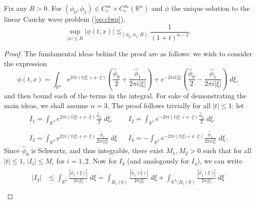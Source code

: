 \documentclass{article}
\begin{document}
\begin{prop}
	Fix any $R > 0$. For $(\phi_{0}, \phi_{1}) \in C_{c}^{\infty} \times C_{c}^{\infty}(\mathbb{R}^{n})$ and $\phi$ the unique solution to the linear Cauchy wave problem (\ref{eq:clwp}), 
	\begin{equation}
		\sup_{|x| \leq R}|\phi(t, x)|\lesssim_{(\phi_{0}, \phi_{1}, R)} \frac{1}{(1 + t)^{n - 1}}. 
		\label{eq:decay_clwp_1}
	\end{equation}
\end{prop}

\begin{proof}
	The fundamental ideas behind the proof are as follows: we wish to consider the expression 
	\begin{equation*}
		\phi(t, x) = \int_{\mathbb{R}^{n}}e^{2\pi i (t|\xi| + x \cdot \xi)}\left(\frac{\hat{\phi}_{0}}{2} + \frac{\hat{\phi}_{1}}{2\pi i |\xi|}\right) + e^{-2\pi i t|\xi|}\left(\frac{\hat{\phi}_{0}}{2} - \frac{\hat{\phi}_{1}}{2\pi i |\xi|}\right)\;d\xi, 
	\end{equation*}
	and then bound each of the terms in the integral. For sake of demonstrating the main ideas, we shall assume $n = 3$. The proof follows trivially for all $|t| \leq 1$: let 
	\begin{equation*}
		\begin{matrix}
			\displaystyle I_{1} = \int_{\mathbb{R}^{3}}e^{2\pi i (t|\xi| + x \cdot \xi)}\frac{\hat{\phi}_{0}}{2}\;d\xi, & & \displaystyle I_{2} = \int_{\mathbb{R}^{3}}e^{-2\pi i (t|\xi| + x \cdot \xi)}\frac{\hat{\phi}_{0}}{2}\;d\xi. \\ && \\
			\displaystyle I_{3}  = \int_{\mathbb{R}^{3}}e^{2\pi i (t|\xi| + x \cdot \xi)}\frac{\hat{\phi}_{1}}{2\pi i |\xi|}\;d\xi && \displaystyle I_{4} = -\int_{\mathbb{R}^{3}}e^{-2\pi i(t|\xi| + x \cdot \xi)}\frac{\hat{\phi}_{1}}{2\pi i |\xi|}\;d\xi. 
		\end{matrix}
	\end{equation*}
	Since $\hat{\phi}_{0}$ is Schwartz, and thus integrable, there exist $M_{1}, M_{2} > 0$ such that for all $|t|\leq 1$, $|I_{i}| \leq M_{i}$ for $i = 1, 2$. Now for $I_{3}$ (and analogously for $I_{4}$), we can write 
	\begin{align*}
		\begin{split}
			|I_{3}| &\leq \int_{\mathbb{R}^{3}}\frac{|\hat{\phi}_{1}(\xi)|}{2\pi |\xi|}\;d\xi = \int_{B_{1}(0)}\frac{|\hat{\phi}_{1}(\xi)|}{2\pi |\xi|}\;d\xi + \int_{\mathbb{R}^{3}\setminus B_{1}(0)}\frac{|\hat{\phi}_{1}(\xi)|}{2\pi |\xi|}\;d\xi \\

\end{split}
\end{align*}
\end{proof}
\end{document}
